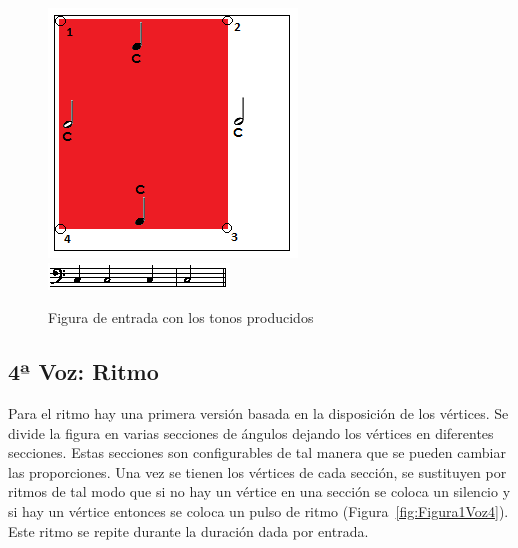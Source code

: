 		\begin{figure}[htbp]
		\centering
		\hspace*{0.0in}
		\includegraphics[scale=1]{graphics/simpletest2-F2F3_2.png}
		\includegraphics[scale=1]{graphics/simpletest3_2-BASSpartitura.png}
		\caption{Figura de entrada con los tonos producidos}
		\label{fig:Figura2Voz3}
		\end{figure}


\subsection{4ª Voz: Ritmo}

Para el ritmo hay una primera versión basada en la disposición de los vértices. Se divide la figura en varias secciones de ángulos dejando los vértices en diferentes secciones. Estas secciones son configurables de tal manera que se pueden cambiar las proporciones. Una vez se tienen los vértices de cada sección, se sustituyen por ritmos de tal modo que si no hay un vértice en una sección se coloca un silencio y si hay un vértice entonces se coloca un pulso de ritmo (Figura~\ref{fig:Figura1Voz4}). Este ritmo se repite durante la duración dada por entrada.

